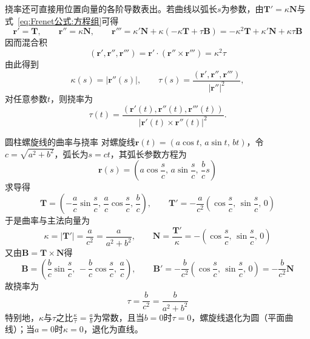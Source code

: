 挠率还可直接用位置向量的各阶导数表出。若曲线以弧长$s$为参数，由$\mathbf{T}'=\kappa\mathbf{N}$与式~\eqref{eq:Frenet公式:方程组}可得
\begin{equation}
	\mathbf{r}'=\mathbf{T},\qquad
	\mathbf{r}''=\kappa\mathbf{N},\qquad
	\mathbf{r}'''=\kappa'\mathbf{N}+\kappa(-\kappa\mathbf{T}+\tau\mathbf{B})
	=-\kappa^{2}\mathbf{T}+\kappa'\mathbf{N}+\kappa\tau\mathbf{B}
\end{equation}
因而混合积
\begin{equation}
	(\mathbf{r}',\mathbf{r}'',\mathbf{r}''')
	=\mathbf{r}'\cdot(\mathbf{r}''\times\mathbf{r}''')
	=\kappa^{2}\tau
	\label{eq:挠率:混合积}
\end{equation}
由此得到
\begin{equation}
	\kappa(s)=|\mathbf{r}''(s)|,\qquad
	\tau(s)=\frac{(\mathbf{r}',\mathbf{r}'',\mathbf{r}''')}{|\mathbf{r}''|^{2}},
	\label{eq:挠率:任意参数公式}
\end{equation}
对任意参数$t$，则挠率为
\begin{equation}
	\tau(t)=\frac{(\mathbf{r}'(t),\mathbf{r}''(t),\mathbf{r}'''(t))}{|\mathbf{r}'(t)\times\mathbf{r}''(t)|^{2}}.
	\label{eq:挠率:一般参数公式}
\end{equation}

\begin{example}{圆柱螺旋线的曲率与挠率}
	对螺旋线$\mathbf{r}(t)=(a\cos t,\,a\sin t,\,bt)$，令$c=\sqrt{a^{2}+b^{2}}$，弧长为$s=ct$，其弧长参数方程为
	\begin{equation}
		\mathbf{r}(s)=\left(a\cos\frac{s}{c},\,a\sin\frac{s}{c},\,\frac{b}{c}s\right)
	\end{equation}
	求导得
	\begin{equation}
		\mathbf{T}=\left(-\frac{a}{c}\sin\frac{s}{c},\,\frac{a}{c}\cos\frac{s}{c},\,\frac{b}{c}\right),\qquad
		\mathbf{T}'=-\frac{a}{c^{2}}\left(\cos\frac{s}{c},\,\sin\frac{s}{c},\,0\right)
	\end{equation}
	于是曲率与主法向量为
	\begin{equation}
		\kappa=|\mathbf{T}'|=\frac{a}{c^{2}}=\frac{a}{a^{2}+b^{2}},\qquad
		\mathbf{N}=\frac{\mathbf{T}'}{\kappa}=-\left(\cos\frac{s}{c},\,\sin\frac{s}{c},\,0\right)
	\end{equation}
	又由$\mathbf{B}=\mathbf{T}\times\mathbf{N}$得
	\begin{equation}
		\mathbf{B}=\left(\frac{b}{c}\sin\frac{s}{c},\,-\frac{b}{c}\cos\frac{s}{c},\,\frac{a}{c}\right),\qquad
		\mathbf{B}'=-\frac{b}{c^{2}}\left(\cos\frac{s}{c},\,\sin\frac{s}{c},\,0\right)=-\frac{b}{c^{2}}\mathbf{N}
	\end{equation}
	故挠率为
	\begin{equation}
		\tau=\frac{b}{c^{2}}=\frac{b}{a^{2}+b^{2}}
	\end{equation}
	特别地，$\kappa$与$\tau$之比$\frac{\kappa}{\tau}=\frac{a}{b}$为常数，且当$b=0$时$\tau=0$，螺旋线退化为圆（平面曲线）；当$a=0$时$\kappa=0$，退化为直线。
\end{example}

